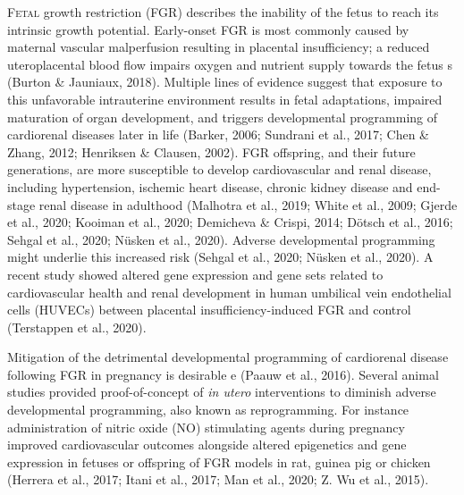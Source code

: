 \documentclass[authordate, empirical]{jote-new-article}
\begin{document}
\lettrine{F}{etal} growth restriction (FGR) describes the inability of the fetus to reach its intrinsic growth potential. Early-onset FGR is most commonly caused by maternal vascular malperfusion resulting in placental insufficiency; a reduced uteroplacental blood flow impairs oxygen and nutrient supply towards the fetus s (Burton \& Jauniaux, 2018). Multiple lines of evidence suggest that exposure to this unfavorable intrauterine environment results in fetal adaptations, impaired maturation of organ development, and triggers developmental programming of cardiorenal diseases later in life (Barker, 2006; Sundrani et al., 2017; Chen \& Zhang, 2012; Henriksen \& Clausen, 2002). FGR offspring, and their future generations, are more susceptible to develop cardiovascular and renal disease, including hypertension, ischemic heart disease, chronic kidney disease and end-stage renal disease in adulthood (Malhotra et al., 2019; White et al., 2009; Gjerde et al., 2020; Kooiman et al., 2020; Demicheva \& Crispi, 2014; Dötsch et al., 2016; Sehgal et al., 2020; Nüsken et al., 2020). Adverse developmental programming might underlie this increased risk (Sehgal et al., 2020; Nüsken et al., 2020). A recent study showed altered gene expression and gene sets related to cardiovascular health and renal development in human umbilical vein endothelial cells (HUVECs) between placental insufficiency-induced FGR and control (Terstappen et al., 2020).



Mitigation of the detrimental developmental programming of cardiorenal disease following FGR in pregnancy is desirable e (Paauw et al., 2016). Several animal studies provided proof-of-concept of \emph{in utero }interventions to diminish adverse developmental programming, also known as reprogramming. For instance administration of nitric oxide (NO) stimulating agents during pregnancy improved cardiovascular outcomes alongside altered epigenetics and gene expression in fetuses or offspring of FGR models in rat, guinea pig or chicken (Herrera et al., 2017; Itani et al., 2017; Man et al., 2020; Z. Wu et al., 2015).
\end{document}
